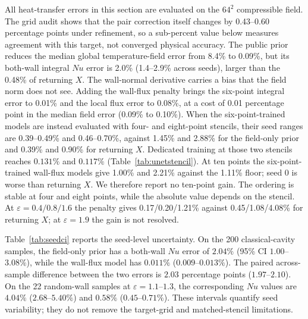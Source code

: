 \documentclass[preprint,11pt,a4paper,times]{elsarticle}
\begin{document}
All heat-transfer errors in this section are evaluated on the $64^2$ compressible field. The
grid audit shows that the pair correction itself changes by 0.43--0.60 percentage points under
refinement, so a sub-percent value below measures agreement with this target, not converged
physical accuracy. The public prior reduces the median global temperature-field error from
8.4\% to 0.09\%, but its both-wall integral $Nu$ error is 2.0\% (1.4--2.9\% across seeds),
larger than the 0.48\% of returning $X$. The wall-normal derivative carries a bias that the
field norm does not see. Adding the wall-flux penalty brings the six-point integral error to
0.01\% and the local flux error to 0.08\%, at a cost of 0.01 percentage point in the median
field error (0.09\% to 0.10\%). When the six-point-trained models are instead evaluated
with four- and eight-point stencils, their seed ranges are 0.39--0.49\% and
0.46--0.70\%, against 1.45\% and 2.88\% for the field-only prior and 0.39\% and
0.90\% for returning $X$. Dedicated training at those two stencils reaches $0.131\%$
and $0.117\%$ (Table~\ref{tab:unetstencil}).
At ten points the six-point-trained wall-flux models give 1.00\% and 2.21\% against the
1.11\% floor; seed 0 is worse than returning $X$. We therefore report no ten-point gain. The
ordering is stable at four and eight points, while the absolute value depends on the stencil.
At $\varepsilon=0.4/0.8/1.6$ the penalty gives
0.17/0.20/1.21\% against 0.45/1.08/4.08\% for returning $X$; at $\varepsilon=1.9$ the gain is
not resolved.

Table~\ref{tab:seedci} reports the seed-level uncertainty. On the 200 classical-cavity samples,
the field-only prior has a both-wall $Nu$ error of $2.04\%$ (95\% CI $1.00$--$3.08\%$), while
the wall-flux model has $0.011\%$ ($0.009$--$0.013\%$). The paired across-sample difference
between the two errors is $2.03$ percentage points ($1.97$--$2.10$). On the 22 random-wall
samples at $\varepsilon=1.1$--$1.3$, the corresponding $Nu$ values are $4.04\%$
($2.68$--$5.40\%$) and $0.58\%$ ($0.45$--$0.71\%$). These intervals quantify seed variability;
they do not remove the target-grid and matched-stencil limitations.
\end{document}
